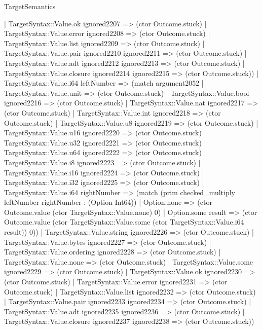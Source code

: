 \begin{lexlean}{TargetSemantics}
\begin{semanticmodule}
{              | TargetSyntax::Value.ok ignored2207 => (ctor Outcome.stuck)
              | TargetSyntax::Value.error ignored2208 => (ctor Outcome.stuck)
              | TargetSyntax::Value.list ignored2209 => (ctor Outcome.stuck)
              | TargetSyntax::Value.pair ignored2210 ignored2211 => (ctor Outcome.stuck)
              | TargetSyntax::Value.adt ignored2212 ignored2213 => (ctor Outcome.stuck)
              | TargetSyntax::Value.closure ignored2214 ignored2215 => (ctor Outcome.stuck))
            | TargetSyntax::Value.i64 leftNumber => (match argument2052
              | TargetSyntax::Value.unit => (ctor Outcome.stuck)
              | TargetSyntax::Value.bool ignored2216 => (ctor Outcome.stuck)
              | TargetSyntax::Value.nat ignored2217 => (ctor Outcome.stuck)
              | TargetSyntax::Value.int ignored2218 => (ctor Outcome.stuck)
              | TargetSyntax::Value.u8 ignored2219 => (ctor Outcome.stuck)
              | TargetSyntax::Value.u16 ignored2220 => (ctor Outcome.stuck)
              | TargetSyntax::Value.u32 ignored2221 => (ctor Outcome.stuck)
              | TargetSyntax::Value.u64 ignored2222 => (ctor Outcome.stuck)
              | TargetSyntax::Value.i8 ignored2223 => (ctor Outcome.stuck)
              | TargetSyntax::Value.i16 ignored2224 => (ctor Outcome.stuck)
              | TargetSyntax::Value.i32 ignored2225 => (ctor Outcome.stuck)
              | TargetSyntax::Value.i64 rightNumber => (match (prim checked_multiply leftNumber rightNumber : (Option Int64))
                | Option.none => (ctor Outcome.value (ctor TargetSyntax::Value.none) 0)
                | Option.some result => (ctor Outcome.value (ctor TargetSyntax::Value.some (ctor TargetSyntax::Value.i64 result)) 0))
              | TargetSyntax::Value.string ignored2226 => (ctor Outcome.stuck)
              | TargetSyntax::Value.bytes ignored2227 => (ctor Outcome.stuck)
              | TargetSyntax::Value.ordering ignored2228 => (ctor Outcome.stuck)
              | TargetSyntax::Value.none => (ctor Outcome.stuck)
              | TargetSyntax::Value.some ignored2229 => (ctor Outcome.stuck)
              | TargetSyntax::Value.ok ignored2230 => (ctor Outcome.stuck)
              | TargetSyntax::Value.error ignored2231 => (ctor Outcome.stuck)
              | TargetSyntax::Value.list ignored2232 => (ctor Outcome.stuck)
              | TargetSyntax::Value.pair ignored2233 ignored2234 => (ctor Outcome.stuck)
              | TargetSyntax::Value.adt ignored2235 ignored2236 => (ctor Outcome.stuck)
              | TargetSyntax::Value.closure ignored2237 ignored2238 => (ctor Outcome.stuck))
}
\end{semanticmodule}
\end{lexlean}
